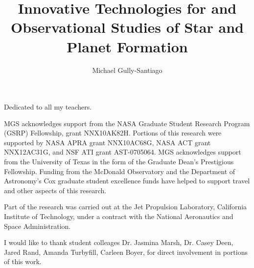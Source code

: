 \documentclass[12pt]{report}	%
\author{Michael Gully-Santiago}  	%
\title{Innovative Technologies for and Observational Studies of Star and Planet Formation}
\begin{document}
\copyrightpage          %


%
%
%
\commcertpage           %

\titlepage              %



%
\begin{dedication}
%
Dedicated to all my teachers.
\end{dedication}


\begin{acknowledgments}		%
%
MGS acknowledges support from the NASA Graduate Student Research Program (GSRP) Fellowship, grant NNX10AK82H.  Portions of this research were supported by NASA APRA grant NNX10AC68G, NASA ACT grant NNX12AC31G, and NSF ATI grant AST-0705064.  MGS acknowledges support from the University of Texas in the form of the Graduate Dean's Prestigious Fellowship.  Funding from the McDonald Observatory and the Department of Astronomy's Cox graduate student excellence funds have helped to support travel and other aspects of this research.

Part of the research was carried out at the Jet Propulsion Laboratory, California Institute of Technology, under a contract with the National Aeronautics and Space Administration. 

I would like to thank student colleages Dr. Jasmina Marsh, Dr. Casey Deen, Jared Rand, Amanda Turbyfill, Carleen Boyer, for direct involvement in portions of this work.

\end{acknowledgments}


%
\utabstract
{}%
\indent
\end{document}
